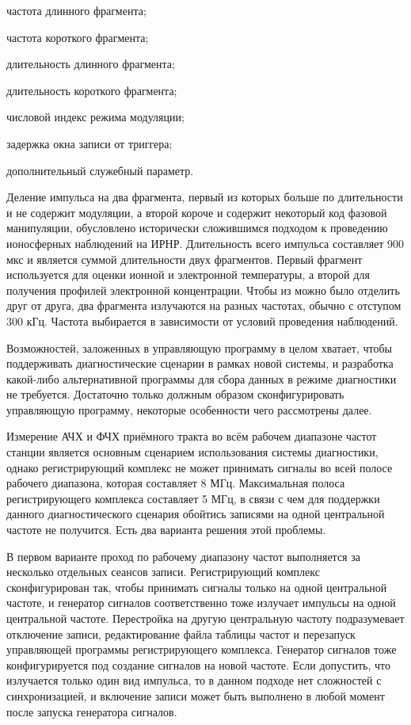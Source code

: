 \documentclass{report}
\begin{document}
\begin{enummarker}
    \item частота длинного фрагмента;
    \item частота короткого фрагмента;
    \item длительность длинного фрагмента;
    \item длительность короткого фрагмента;
    \item числовой индекс режима модуляции;
    \item задержка окна записи от триггера;
    \item дополнительный служебный параметр.
\end{enummarker}

Деление импульса на два фрагмента, первый из которых больше по длительности и не содержит модуляции, а второй короче и содержит некоторый код фазовой манипуляции, обусловлено исторически сложившимся подходом к проведению ионосферных наблюдений на ИРНР. Длительность всего импульса составляет 900 мкс и является суммой длительности двух фрагментов. Первый фрагмент используется для оценки ионной и электронной температуры, а второй для получения профилей электронной концентрации. Чтобы из можно было отделить друг от друга, два фрагмента излучаются на разных частотах, обычно с отступом 300 кГц. Частота выбирается в зависимости от условий проведения наблюдений.

Возможностей, заложенных в управляющую программу в целом хватает, чтобы поддерживать диагностические сценарии в рамках новой системы, и разработка какой-либо альтернативной программы для сбора данных в режиме диагностики не требуется. Достаточно только должным образом сконфигурировать управляющую программу, некоторые особенности чего рассмотрены далее.

Измерение АЧХ и ФЧХ приёмного тракта во всём рабочем диапазоне частот станции является основным сценарием использования системы диагностики, однако регистрирующий комплекс не может принимать сигналы во всей полосе рабочего диапазона, которая составляет 8 МГц. Максимальная полоса регистрирующего комплекса составляет 5 МГц, в связи с чем для поддержки данного диагностического сценария обойтись записями на одной центральной частоте не получится. Есть два варианта решения этой проблемы.

В первом варианте проход по рабочему диапазону частот выполняется за несколько отдельных сеансов записи. Регистрирующий комплекс сконфигурирован так, чтобы принимать сигналы только на одной центральной частоте, и генератор сигналов соответственно тоже излучает импульсы на одной центральной частоте. Перестройка на другую центральную частоту подразумевает отключение записи, редактирование файла таблицы частот и перезапуск управляющей программы регистрирующего комплекса. Генератор сигналов тоже конфигурируется под создание сигналов на новой частоте. Если допустить, что излучается только один вид импульса, то в данном подходе нет сложностей с синхронизацией, и включение записи может быть выполнено в любой момент после запуска генератора сигналов.
\end{document}
